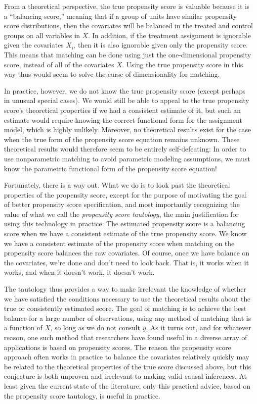 \documentclass[11pt,titlepage]{article}
\begin{document}
From a theoretical perspective, the true propensity score is valuable
because it is a ``balancing score,'' meaning that if a group of units
have similar propensity score distributions, then the covariates will
be balanced in the treated and control groups on all variables in $X$.
In addition, if the treatment assignment is ignorable given the
covariates $X_i$, then it is also ignorable given only the propensity
score.  This means that matching can be done using just the
one-dimensional propensity score, instead of all of the covariates
$X$.  Using the true propensity score in this way thus would seem to
solve the curse of dimensionality for matching.

In practice, however, we do not know the true propensity score (except
perhaps in unusual special cases).  We would still be able to appeal
to the true propensity score's theoretical properties if we had a
consistent estimate of it, but such an estimate would require knowing
the correct functional form for the assignment model, which is highly
unlikely.  Moreover, no theoretical results exist for the case when
the true form of the propensity score equation remains unknown.  These
theoretical results would therefore seem to be entirely
self-defeating: In order to use nonparametric matching to avoid
parametric modeling assumptions, we must know the parametric
functional form of the propensity score equation!

Fortunately, there is a way out.  What we do is to look past the
theoretical properties of the propensity score, except for the purpose
of motivating the goal of better propensity score specification, and
most importantly recognizing the value of what we call the
\emph{propensity score tautology}, the main justification for using
this technology in practice: The estimated propensity score is a
balancing score when we have a consistent estimate of the true
propensity score.  We know we have a consistent estimate of the
propensity score when matching on the propensity score balances the
raw covariates.  Of course, once we have balance on the covariates,
we're done and don't need to look back.  That is, it works when it
works, and when it doesn't work, it doesn't work.

The tautology thus provides a way to make irrelevant the knowledge of
whether we have satisfied the conditions necessary to use the
theoretical results about the true or consistently estimated score.
The goal of matching is to achieve the best balance for a large number
of observations, using any method of matching that is a function of
$X$, so long as we do not consult $y$.  As it turns out, and for
whatever reason, one such method that researchers have found useful in
a diverse array of applications is based on propensity scores.  The
reason the propensity score approach often works in practice to
balance the covariates relatively quickly may be related to the
theoretical properties of the true score discussed above, but this
conjecture is both unproven and irrelevant to making valid causal
inferences.  At least given the current state of the literature, only
this practical advice, based on the propensity score tautology, is
useful in practice.
\end{document}
